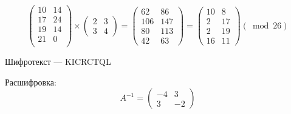 \documentclass[a4paper, 14pt]{extarticle}
\begin{document}
\begin{enumerate}
    \begin{equation*}
        \left( \begin{matrix}
            10 & 14 \\
            17 & 24 \\
            19 & 14 \\
            21 & 0 \\
        \end{matrix} \right) \times
        \left( \begin{matrix}
            2 & 3\\
            3 & 4
        \end{matrix}\right) = \left( \begin{matrix}
            62 & 86\\
            106 & 147\\
            80 & 113\\
            42 & 63
        \end{matrix} \right) = \left( \begin{matrix}
            10 & 8\\
            2 & 17\\
            2 & 19\\
            16 & 11
        \end{matrix} \right) (\bmod 26)
    \end{equation*}

    Шифротекст --- KICRCTQL

    Расшифровка:
    \begin{equation*}
        A^{-1} = \left(\begin{matrix}
            -4 & 3\\
            3 & -2
        \end{matrix}\right)
    \end{equation*}
    

\end{enumerate}
\end{document}
